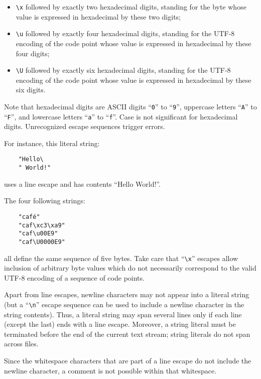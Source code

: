 \begin{itemize}
\begin{itemize}
\begin{itemize}
            \item \verb|\x| followed by exactly two hexadecimal digits,
            standing for the byte whose value is expressed in hexadecimal
            by these two digits;

            \item \verb|\u| followed by exactly four hexadecimal digits,
            standing for the UTF-8 encoding of the code point whose value
            is expressed in hexadecimal by these four digits;

            \item \verb|\U| followed by exactly six hexadecimal digits,
            standing for the UTF-8 encoding of the code point whose value
            is expressed in hexadecimal by these six digits.

        \end{itemize}

        Note that hexadecimal digits are ASCII digits ``\verb|0|'' to
        ``\verb|9|'', uppercase letters ``\verb|A|'' to ``\verb|F|'',
        and lowercase letters ``\verb|a|'' to ``\verb|f|''. Case is not
        significant for hexadecimal digits. Unrecognized escape
        sequences trigger errors.

    \end{itemize}

\end{itemize}

For instance, this literal string:
\begin{verbatim}
    "Hello\
    " World!"
\end{verbatim}
uses a line escape and has contents ``Hello World!''.

The four following strings:
\begin{verbatim}
    "café"
    "caf\xc3\xa9"
    "caf\u00E9"
    "caf\U0000E9"
\end{verbatim}
all define the same sequence of five bytes. Take care that ``\verb|\x|''
escapes allow inclusion of arbitrary byte values which do not
necessarily correspond to the valid UTF-8 encoding of a sequence of code
points.

Apart from line escapes, newline characters may not appear into a
literal string (but a ``\verb|\n|'' escape sequence can be used to
include a newline character in the string contents). Thus, a literal
string may span several lines only if each line (except the last) ends
with a line escape. Moreover, a string literal must be terminated before
the end of the current text stream; string literals do not span across
files.

Since the whitespace characters that are part of a line escape do not
include the newline character, a comment is not possible within that
whitespace.
